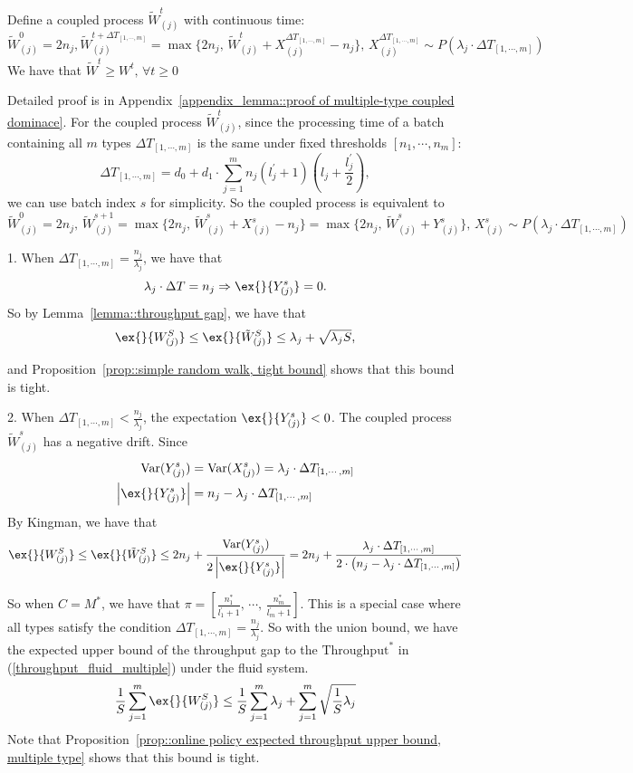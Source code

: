 \begin{lemma}\label{lemma::multiple-type coupled dominace}
Define a coupled process $\tilde{W}^t_{(j)}$ with continuous time:
$$\tilde{W}_{(j)}^0=2n_j, \tilde{W}_{(j)}^{t+\Delta T_{[1,\cdots,m]}}= \max\{ 2n_j,\, \tilde{W}_{(j)}^t +X_{(j)}^{\Delta T_{[1,\cdots,m]}}-n_j \},\, X^{\Delta T_{[1,\cdots,m]}}_{(j)} \sim P(\lambda_j\cdot \Delta T_{[1,\cdots,m]}) $$
We have that $\tilde{W}^t\geq W^t,\,\forall t\geq 0$
\end{lemma}
Detailed proof is in Appendix~\ref{appendix_lemma::proof of multiple-type coupled dominace}. For the coupled process $\tilde{W}^t_{(j)}$, since the processing time of a batch containing all $m$ types $\Delta T_{[1,\cdots,m]}$ is the same under fixed thresholds $[n_1,\cdots,n_m]$:
$$\Delta T_{[1,\cdots,m]} =  d_0 + d_1 \cdot \sum_{j=1}^m n_j(l_j^\prime+1)\left( l_j+\frac{l_j^\prime}{2} \right) ,$$
we can use batch index $s$ for simplicity. So the coupled process is equivalent to
$$\tilde{W}^0_{(j)} = 2n_j,\, \tilde{W}^{s+1}_{(j)} = \max\{ 2n_j, \, \tilde{W}^s_{(j)}+X^s_{(j)} - n_j \}=\max\{ 2n_j, \, \tilde{W}^s_{(j)}+Y^s_{(j)} \},\, X^s_{(j)} \sim P(\lambda_j \cdot \Delta T_{[1,\cdots,m]})$$

1. When $ \Delta T_{[1,\cdots,m]} = \frac{n_j}{\lambda_j}$, we have that
$$\lambda_j\cdot \Delta T = n_j\Rightarrow \ex{}{Y^s_{(j)}}=0.$$
So by Lemma~\ref{lemma::throughput gap}, we have that
$$\ex{}{W^S_{(j)}}\leq \ex{}{\tilde{W}^S_{(j)}}\leq \lambda_j + \sqrt{\lambda_j S}, $$

and Proposition~\ref{prop::simple random walk, tight bound} shows that this bound is tight.

2. When $\Delta T_{[1,\cdots,m]} < \frac{n_j}{\lambda_j}$, the expectation $\ex{}{Y^s_{(j)}}<0$. The coupled process $\tilde{W}^s_{(j)}$ has a negative drift. Since
\begin{align*}
\text{Var}(Y^s_{(j)} )&= \text{Var}(X^s_{(j)} )  = \lambda_j \cdot \Delta T_{[1,\cdots,m]}\\
\left| \ex{}{Y^s_{(j)}} \right| &= n_j - \lambda_j\cdot \Delta T_{[1,\cdots,m]}
\end{align*}
By Kingman, we have that
$$\ex{}{W^S_{(j)}}\leq \ex{}{\tilde{W}^S_{(j)}}\leq 2n_j + \frac{\text{Var}(Y^s_{(j)} )}{2\left| \ex{}{Y^s_{(j)}} \right| } =2n_j+ \frac{\lambda_j \cdot \Delta T_{[1,\cdots,m]}}{2\cdot\left(n_j - \lambda_j\cdot \Delta T_{[1,\cdots,m]}\right)}$$

So when $C = M^*$, we have that $\pi = [\frac{n_1^*}{l_1^\prime+1},\,\cdots,\, \frac{n_m^*}{l_m^\prime+1}]$. This is a special case where all types satisfy the condition $\Delta T_{[1,\cdots,m]} = \frac{n_j}{\lambda_j}$. So with the union bound, we have the expected upper bound of the throughput gap to the $\text{Throughput}^*$ in (\ref{throughput_fluid_multiple}) under the fluid system.
$$\frac{1}{S}\sum_{j=1}^m \ex{}{W^S_{(j)}}\leq \frac{1}{S}\sum_{j=1}^m \lambda_j +\sum_{j=1}^m \sqrt{\frac{1}{S}\lambda_j} $$
Note that Proposition~\ref{prop::online policy expected throughput upper bound, multiple type} shows that this bound is tight.

